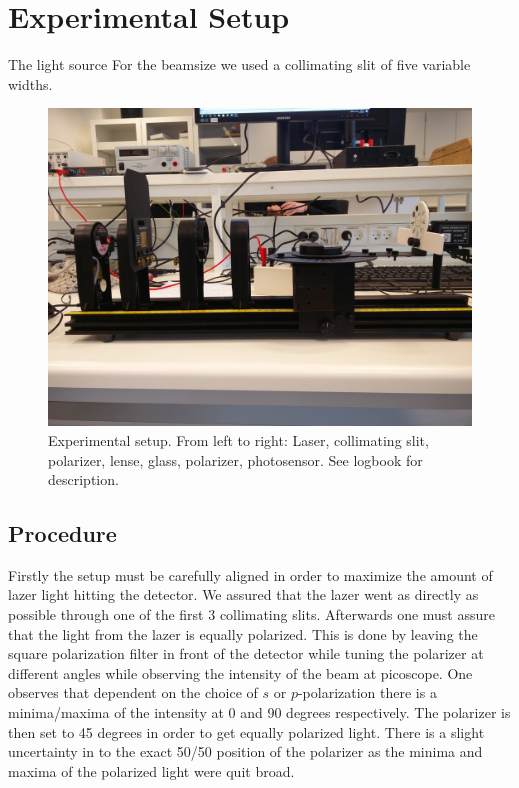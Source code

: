 \section{Experimental Setup}
The light source For the beamsize we used a collimating slit of five variable widths.

\begin{figure}[h]
    \centering
    \includegraphics[trim={0 25cm 0 20cm}, clip, width=\columnwidth]{setup}
    \caption{Experimental setup. From left to right: Laser, collimating slit, polarizer, lense, glass, polarizer, photosensor. See logbook for description.}
    \label{fig:setup}
\end{figure}

\subsection{Procedure}

Firstly the setup must be carefully aligned in order to maximize the amount of lazer light hitting the detector.  We assured that the lazer went as directly as possible through one of the first 3 collimating slits. Afterwards one must assure that the light from the lazer is equally polarized. This is done by leaving the square polarization filter in front of the detector while tuning the polarizer at different angles while observing the intensity of the beam at picoscope. One observes that dependent on the choice of $s$ or $p$-polarization there is a minima/maxima of the intensity at 0 and 90 degrees respectively. The polarizer is then set to 45 degrees in order to get equally polarized light. There is a slight uncertainty in to the exact 50/50 position of the polarizer as the minima and maxima of the polarized light were quit broad.\\

